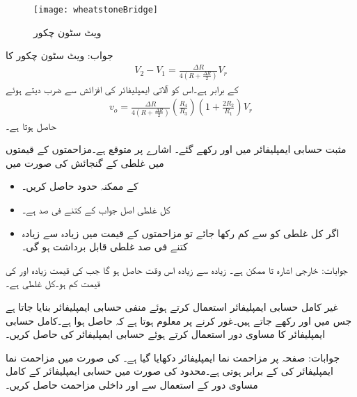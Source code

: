 \begin{figure}
\centering
\texttt{[image: wheatstoneBridge]}
\caption{ویٹ سٹون چکور}
\label{شکل__سوال_ویٹ_سٹون_چکور}
\end{figure}
جواب:
ویٹ سٹون چکور کا
\begin{align*}
V_2-V_1=\frac{\Delta R}{4 \left(R+\frac{\Delta R}{2} \right)}  V_r
\end{align*}
کے برابر ہے۔اس کو آلاتی ایمپلیفائر کی افزائش سے ضرب دیتے ہوئے
%  
\begin{align*}
v_o=\frac{\Delta R}{4 \left(R+\frac{\Delta R}{2} \right)} \left(\frac{R_4}{R_3}\right) \left(1+\frac{2R_2}{R_1} \right) V_r
\end{align*}
حاصل ہوتا ہے۔


مثبت حسابی ایمپلیفائر میں  اور  رکھے گئے۔ اشارے پر  متوقع ہے۔مزاحمتوں کے قیمتوں میں  غلطی  کے گنجائش کی صورت میں
\begin{itemize}
\item
{}  کے ممکنہ حدود حاصل کریں۔
\item
کل غلطی اصل جواب کے کتنے فی صد ہے۔
\item
اگر کل غلطی کو  سے کم رکھا جائے تو مزاحمتوں کے قیمت میں زیادہ سے زیادہ کتنے فی صد غلطی قابل برداشت ہو گی۔
\end{itemize}

جوابات: خارجی اشارہ  تا  ممکن ہے۔   زیادہ سے زیادہ  اس وقت حاصل ہو گا جب   کی قیمت  زیادہ اور  کی قیمت   کم ہو۔کل غلطی  ہے۔

غیر کامل حسابی ایمپلیفائر استعمال کرتے ہوئے  منفی حسابی ایمپلیفائر بنایا جاتا ہے جس میں  اور  رکھے جاتے ہیں۔غور کرنے پر معلوم ہوتا ہے کہ  حاصل ہوا ہے۔کامل حسابی ایمپلیفائر کا مساوی دور استعمال کرتے ہوئے  حسابی ایمپلیفائر کی  حاصل کریں۔

جوابات: 
صفحہ  پر مزاحمت نما ایمپلیفائر دکھایا گیا ہے۔ کی صورت میں مزاحمت نما ایمپلیفائر کی
  کے برابر ہوتی ہے۔محدود  کی صورت میں  حسابی ایمپلیفائر کے کامل مساوی دور کے استعمال سے  اور داخلی مزاحمت حاصل کریں۔

